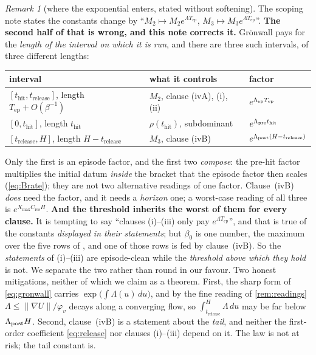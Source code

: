 \documentclass[11pt]{article}
\theoremstyle{remark}
\newtheorem{remark}[theorem]{Remark}
\newcommand{\thit}{t_{\mathrm{hit}}}
\newcommand{\trel}{t_{\mathrm{release}}}
\newcommand{\Tep}{T_{\mathrm{ep}}}
\newcommand{\Cres}{C_{\mathrm{res}}}
\newcommand{\Xmax}{X_{\max}}
\begin{document}
\begin{remark}[where the exponential enters, stated without softening]\label{rem:honest}
The scoping note \cite{scoping} states the constants change by ``$M_2\mapsto
M_2e^{\Lambda\Tep}$, $M_3\mapsto M_3e^{\Lambda\Tep}$''. \textbf{The second half
of that is wrong, and this note corrects it.} Grönwall pays for the
\emph{length of the interval on which it is run}, and there are three such
intervals, of three different lengths:
\begin{center}
\begin{tabular}{lll}
\toprule
interval & what it controls & factor \\
\midrule
$[\thit,\trel]$, length $\Tep+O(\beta^{-1})$ & $M_2$, clause (ivA), (i), (ii) & $e^{\Lambda_{\rm ep}\Tep}$ \\
$[0,\thit]$, length $\thit$ & $\rho(\thit)$, subdominant & $e^{\Lambda_{\rm pre}\thit}$ \\
$[\trel,H]$, length $H-\trel$ & $M_3$, clause (ivB) & $e^{\Lambda_{\rm post}(H-\trel)}$ \\
\bottomrule
\end{tabular}
\end{center}
Only the first is an episode factor, and the first two \emph{compose}: the
pre-hit factor multiplies the initial datum \emph{inside} the bracket that the
episode factor then scales (\eqref{eq:Brate}); they are not two alternative
readings of one factor. Clause~(ivB) \emph{does} need the factor, and it needs a
\emph{horizon} one; a worst-case reading of all three is $e^{\Xmax\Cres H}$.
\textbf{And the threshold inherits the worst of them for every clause.} It is
tempting to say ``clauses (i)--(iii) only pay $e^{\Lambda\Tep}$'', and that is
true of the constants \emph{displayed in their statements}; but $\beta_0$ is one
number, the maximum over the five rows of \cite[Tab.~5]{paper}, and one of those
rows is fed by clause~(ivB). So the \emph{statements} of (i)--(iii) are
episode-clean while the \emph{threshold above which they hold} is not. We
separate the two rather than round in our favour. Two honest mitigations, neither of which we claim as a
theorem. First, the sharp form of \eqref{eq:gronwall} carries
$\exp\bigl(\int\Lambda(u)\,du\bigr)$, and by the fine reading of
\cref{rem:readings} $\Lambda\le\|\nabla U\|/\varphi_v$ decays along a converging
flow, so $\int_{\trel}^{H}\Lambda\,du$ may be far below $\Lambda_{\rm post}H$.
Second, clause~(ivB) is a statement about the \emph{tail}, and neither the
first-order coefficient \eqref{eq:release} nor clauses (i)--(iii) depend on it.
The law is not at risk; the tail constant is.
\end{remark}
\end{document}
